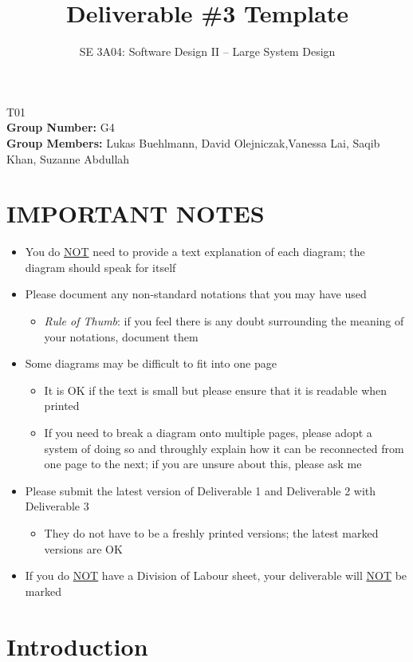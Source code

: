 \documentclass[]{article}
\title{Deliverable \#3 Template}
\author{SE 3A04: Software Design II -- Large System Design}
\date{}
\begin{document}
\maketitle	
{} T01\\
{\bf Group Number:} G4 \\
{\bf Group Members:} Lukas Buehlmann, David Olejniczak,Vanessa Lai, Saqib Khan, Suzanne Abdullah


\section*{IMPORTANT NOTES}
\begin{itemize}
	\item You do \underline{NOT} need to provide a text explanation of each diagram; the diagram should speak for itself
	\item Please document any non-standard notations that you may have used
	\begin{itemize}
		\item \emph{Rule of Thumb}: if you feel there is any doubt surrounding the meaning of your notations, document them
	\end{itemize}
	\item Some diagrams may be difficult to fit into one page
	\begin{itemize}
		\item It is OK if the text is small but please ensure that it is readable when printed
		\item If you need to break a diagram onto multiple pages, please adopt a system of doing so and throughly explain how it can be reconnected from one page to the next; if you are unsure about this, please ask me
	\end{itemize}
	\item Please submit the latest version of Deliverable 1 and Deliverable 2 with Deliverable 3
	\begin{itemize}
		\item They do not have to be a freshly printed versions; the latest marked versions are OK
	\end{itemize}
	\item If you do \underline{NOT} have a Division of Labour sheet, your deliverable will \underline{NOT} be marked
\end{itemize}
\newpage

\section{Introduction}
\label{sec:introduction}
\end{document}
